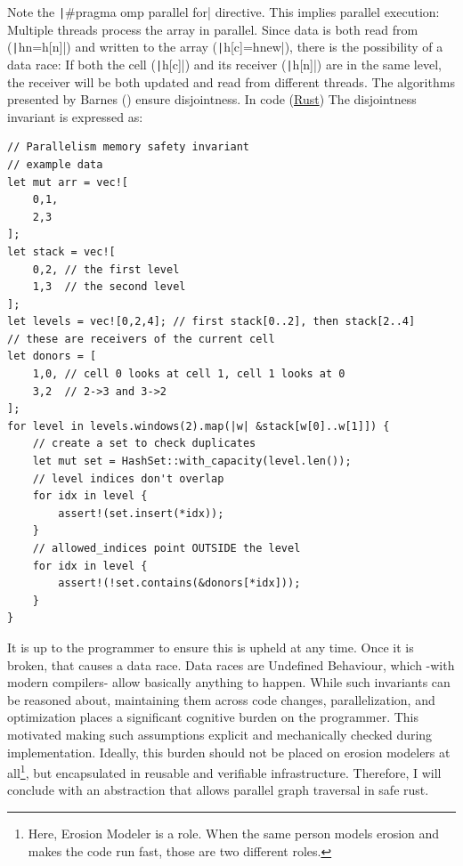 \documentclass[a4paper]{article} %
\begin{document}
Note the \texttt|#pragma omp parallel for| directive. This implies parallel execution: Multiple threads process the array in parallel. Since data is both read from (\texttt|hn=h[n]|) and  written to the array (\texttt|h[c]=hnew|), there is the possibility of a data race: If both the cell (\texttt|h[c]|) and its receiver (\texttt|h[n]|) are in the same level, the receiver will be both updated and read from different threads. The algorithms presented by Barnes (\cite{barnesAcceleratingFluvialIncision2019}) ensure disjointness. In
code
(\href{https://youtu.be/TGfQu0bQTKc}{Rust}) The disjointness invariant is expressed as:
\begin{verbatim}
// Parallelism memory safety invariant
// example data
let mut arr = vec![
    0,1,
    2,3
];
let stack = vec![
    0,2, // the first level
    1,3  // the second level
];
let levels = vec![0,2,4]; // first stack[0..2], then stack[2..4]
// these are receivers of the current cell
let donors = [
    1,0, // cell 0 looks at cell 1, cell 1 looks at 0
    3,2  // 2->3 and 3->2
];
for level in levels.windows(2).map(|w| &stack[w[0]..w[1]]) {
    // create a set to check duplicates
    let mut set = HashSet::with_capacity(level.len());
    // level indices don't overlap
    for idx in level {
        assert!(set.insert(*idx));
    }
    // allowed_indices point OUTSIDE the level
    for idx in level {
        assert!(!set.contains(&donors[*idx]));
    }
}
\end{verbatim}

It is up to the programmer to ensure this is upheld at any time. Once it is broken, that causes a data race. Data races are Undefined Behaviour\cite{desiresSendSync}, which -with modern compilers- allow basically anything to happen\cite{chenUndefinedBehaviorCan2014,regehrGuideUndefinedBehavior2010}. While such invariants can be reasoned about, maintaining them across code changes, parallelization, and optimization places a significant cognitive burden on the programmer. This motivated making such assumptions explicit and mechanically checked during implementation. Ideally, this burden should not be placed on erosion modelers at all\footnote{Here, Erosion Modeler is a role. When the same person models erosion and makes the code run fast, those are two different roles.}, but encapsulated in reusable and verifiable infrastructure. Therefore, I will conclude with an abstraction that allows parallel graph traversal in safe rust.
\end{document}
